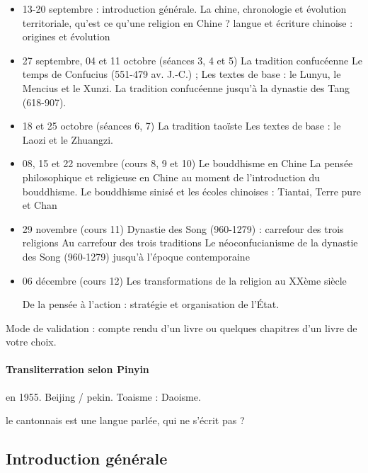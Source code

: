 \begin{itemize}
    \item 13-20 septembre : introduction générale. La chine, chronologie et évolution territoriale, qu'est ce qu'une religion en Chine ? langue et écriture chinoise : origines et évolution

\item	27 septembre, 04 et 11 octobre (séances 3, 4 et 5) La tradition confucéenne
Le temps de Confucius (551-479 av. J.-C.) ;
Les textes de base : le Lunyu, le Mencius et le Xunzi.
La tradition confucéenne jusqu’à la dynastie des Tang (618-907).
\item 	18 et 25 octobre (séances 6, 7) La tradition taoïste
Les textes de base : le Laozi et le Zhuangzi.

\item 	08, 15 et 22 novembre (cours 8, 9 et 10) Le bouddhisme en Chine
La pensée philosophique et religieuse en Chine au moment de l’introduction du bouddhisme.
Le bouddhisme sinisé et les écoles chinoises : Tiantai, Terre pure et Chan

\item 	29 novembre (cours 11) Dynastie des Song (960-1279) : carrefour des trois religions
Au carrefour des trois traditions
Le néoconfucianisme de la dynastie des Song (960-1279) jusqu’à l’époque contemporaine

\item 		06 décembre (cours 12)
Les transformations de la religion au XXème siècle

De la pensée à l’action : stratégie et organisation de l’État.
 
\end{itemize}

Mode de validation : compte rendu d'un livre ou quelques chapitres d'un livre de votre choix. 

\paragraph{Transliterration selon Pinyin} en 1955. Beijing / pekin. 
Toaisme : Daoisme.

\begin{singlequote}
    le cantonnais est une langue parlée, qui ne s'écrit pas ? 
\end{singlequote}

\subsection{Introduction générale}



